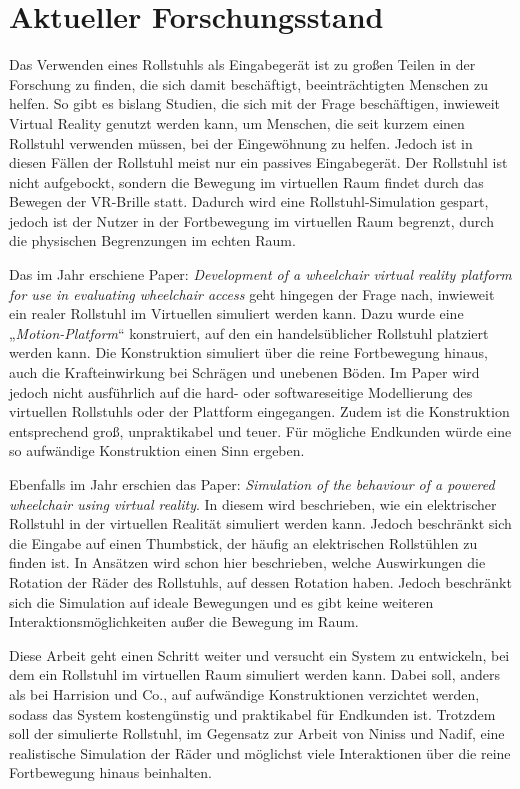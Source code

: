 \chapter{Aktueller Forschungsstand}
Das Verwenden eines Rollstuhls als Eingabegerät ist zu großen Teilen in der Forschung zu finden, die sich damit beschäftigt, beeinträchtigten Menschen zu helfen.
So gibt es bislang Studien, die sich mit der Frage beschäftigen, inwieweit Virtual Reality genutzt werden kann, um Menschen, die seit kurzem einen Rollstuhl verwenden müssen, bei der Eingewöhnung zu helfen\cite{arlatiVirtualRealitybasedWheelchair2020}.
Jedoch ist in diesen Fällen der Rollstuhl meist nur ein passives Eingabegerät.
Der Rollstuhl ist nicht aufgebockt, sondern die Bewegung im virtuellen Raum findet durch das Bewegen der VR-Brille statt.
Dadurch wird eine Rollstuhl-Simulation gespart, jedoch ist der Nutzer in der Fortbewegung im virtuellen Raum begrenzt, durch die physischen Begrenzungen im echten Raum.

Das im Jahr \citeyear{harrisionDevelopmentWheelchairVirtual2000} erschiene Paper: \textit{Development of a wheelchair virtual reality platform for use in evaluating wheelchair access} geht hingegen der Frage nach, inwieweit ein realer Rollstuhl im Virtuellen simuliert werden kann\cite{harrisionDevelopmentWheelchairVirtual2000}.
Dazu wurde eine „\textit{Motion-Platform}“ konstruiert, auf den ein handelsüblicher Rollstuhl platziert werden kann.
Die Konstruktion simuliert über die reine Fortbewegung hinaus, auch die Krafteinwirkung bei Schrägen und unebenen Böden.
Im Paper wird jedoch nicht ausführlich auf die hard- oder softwareseitige Modellierung des virtuellen Rollstuhls oder der Plattform eingegangen.
Zudem ist die Konstruktion entsprechend groß, unpraktikabel und teuer.
Für mögliche Endkunden würde eine so aufwändige Konstruktion einen Sinn ergeben.

Ebenfalls im Jahr \citeyear{ninissSimulationBehaviourPowered2000} erschien das Paper: \textit{Simulation of the behaviour of a powered wheelchair using virtual reality}\cite{ninissSimulationBehaviourPowered2000}.
In diesem wird beschrieben, wie ein elektrischer Rollstuhl in der virtuellen Realität simuliert werden kann.
Jedoch beschränkt sich die Eingabe auf einen Thumbstick, der häufig an elektrischen Rollstühlen zu finden ist.
In Ansätzen wird schon hier beschrieben, welche Auswirkungen die Rotation der Räder des Rollstuhls, auf dessen Rotation haben.
Jedoch beschränkt sich die Simulation auf ideale Bewegungen und es gibt keine weiteren Interaktionsmöglichkeiten außer die Bewegung im Raum.

Diese Arbeit geht einen Schritt weiter und versucht ein System zu entwickeln, bei dem ein Rollstuhl im virtuellen Raum simuliert werden kann.
Dabei soll, anders als bei Harrision und Co., auf aufwändige Konstruktionen verzichtet werden, sodass das System kostengünstig und praktikabel für Endkunden ist.
Trotzdem soll der simulierte Rollstuhl, im Gegensatz zur Arbeit von Niniss und Nadif, eine realistische Simulation der Räder und möglichst viele Interaktionen über die reine Fortbewegung hinaus beinhalten.